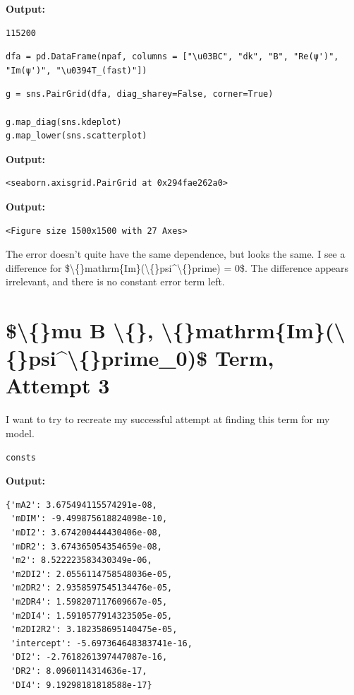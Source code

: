 \documentclass{article}
\begin{document}
\textbf{Output:}\begin{verbatim}
115200

\end{verbatim}

\begin{lstlisting}
dfa = pd.DataFrame(npaf, columns = ["\u03BC", "dk", "B", "Re(ψ')", "Im(ψ')", "\u0394T_(fast)"])\end{lstlisting}

\begin{lstlisting}
g = sns.PairGrid(dfa, diag_sharey=False, corner=True)

g.map_diag(sns.kdeplot)
g.map_lower(sns.scatterplot)\end{lstlisting}

\textbf{Output:}\begin{verbatim}
<seaborn.axisgrid.PairGrid at 0x294fae262a0>
\end{verbatim}

\textbf{Output:}\begin{verbatim}
<Figure size 1500x1500 with 27 Axes>
\end{verbatim}

The error doesn't quite have the same dependence, but looks the same. I see a difference for \$\textbackslash\{\}mathrm\{Im\}(\textbackslash\{\}psi\textasciicircum{}\textbackslash\{\}prime) = 0\$. The difference appears irrelevant, and there is no constant error term left.

\section{\$\textbackslash\{\}mu B \textbackslash\{\}, \textbackslash\{\}mathrm\{Im\}(\textbackslash\{\}psi\textasciicircum{}\textbackslash\{\}prime\_0)\$ Term, Attempt 3}

I want to try to recreate my successful attempt at finding this term for my model.

\begin{lstlisting}
consts\end{lstlisting}

\textbf{Output:}\begin{verbatim}
{'mA2': 3.675494115574291e-08,
 'mDIM': -9.499875618824098e-10,
 'mDI2': 3.674200444430406e-08,
 'mDR2': 3.674365054354659e-08,
 'm2': 8.522223583430349e-06,
 'm2DI2': 2.0556114758548036e-05,
 'm2DR2': 2.9358597545134476e-05,
 'm2DR4': 1.598207117609667e-05,
 'm2DI4': 1.5910577914323505e-05,
 'm2DI2R2': 3.182358695140475e-05,
 'intercept': -5.697364648383741e-16,
 'DI2': -2.7618261397447087e-16,
 'DR2': 8.0960114314636e-17,
 'DI4': 9.19298181818588e-17}
\end{verbatim}
\end{document}
